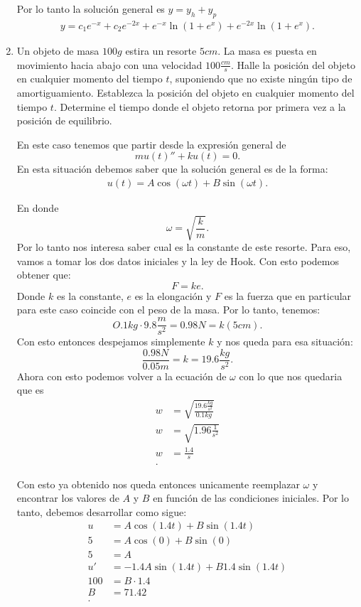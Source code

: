 \begin{enumerate}
	Por lo tanto la solución general es $y = y_h + y_p$
	\begin{align*}
    y =  c_1e^{-x}+c_2e^{-2x} +e^{-x}\ln\left( 1+e^{x} \right) + e^{-2x}\ln\left( 1+e^{x} \right)
	.\end{align*}
      \item Un objeto de masa $100g$ estira un resorte $5cm$. La masa es puesta en movimiento hacia abajo con una velocidad $100 \frac{cm}{s}$. Halle la posición del objeto en cualquier momento del tiempo $t$, suponiendo que no existe ningún tipo de amortiguamiento. Establezca la posición del objeto en cualquier momento del tiempo $t$. Determine el tiempo donde el objeto retorna por primera vez a la posición de equilibrio.

	En este caso tenemos que partir desde la expresión general de \[
	mu\left( t \right) '' + ku\left( t \right)  = 0
	.\] En esta situación debemos saber que la solución general es de la forma:
	\begin{align*} u\left( t \right) = A\cos\left( \omega t \right) + B\sin\left( \omega t \right) 
	.\end{align*}

	En donde \[
	\omega = \sqrt{\frac{k}{m}} 
	.\] Por lo tanto nos interesa saber cual es la constante de este resorte. Para eso, vamos a tomar los dos datos iniciales y la ley de Hook. Con esto podemos obtener que: \[
	F = ke
	.\] Donde $k$ es la constante,  $e$ es la elongación y $F$ es la fuerza que en particular para este caso coincide con el peso de la masa. Por lo tanto, tenemos: \[
	O.1kg\cdot 9.8 \frac{m}{s^2} = 0.98 N = k \left( 5 cm \right) 
	.\] 
	Con esto entonces despejamos simplemente $k$ y nos queda para esa situación: \[
	\frac{0.98N}{0.05m} = k = 19.6  \frac{kg}{s^2}
	.\] 
	Ahora con esto podemos volver a la ecuación de $\omega$ con lo que nos quedaria que es
	\begin{align*}
	  w &= \sqrt{\frac{19.6 \frac{kg}{s^2}}{0.1 kg}}  \\
	  w &= \sqrt{1.96 \frac{1}{s^2}}  \\
	  w &= \frac{1.4}{s} \\
	.\end{align*}

	Con esto ya obtenido nos queda entonces unicamente reemplazar $\omega$ y encontrar los valores de $A$ y $B$ en función de las condiciones iniciales. Por lo tanto, debemos desarrollar como sigue:
	\begin{align*}
	  u &= A\cos\left( 1.4 t \right) + B\sin\left( 1.4 t\right) \\
	  5 &= A\cos\left( 0 \right) + B\sin\left( 0 \right)  \\
	  5 &= A \\
	  u' &= -1.4A\sin\left( 1.4t \right) + B 1.4 \sin\left( 1.4 t \right)  \\
	  100 &= B\cdot 1.4 \\
	  B &= 71.42 \\
	.\end{align*}


\end{enumerate}
